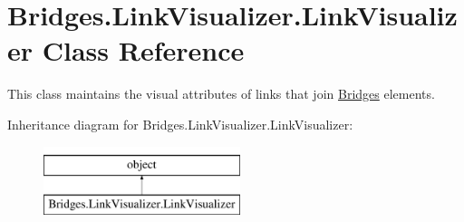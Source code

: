 \hypertarget{class_bridges_1_1_link_visualizer_1_1_link_visualizer}{}\section{Bridges.\+Link\+Visualizer.\+Link\+Visualizer Class Reference}
\label{class_bridges_1_1_link_visualizer_1_1_link_visualizer}


This class maintains the visual attributes of links that join \hyperlink{namespace_bridges_1_1_bridges}{Bridges} elements.  


Inheritance diagram for Bridges.\+Link\+Visualizer.\+Link\+Visualizer\+:\begin{figure}[H]
\begin{center}
\leavevmode
\includegraphics[height=2.000000cm]{class_bridges_1_1_link_visualizer_1_1_link_visualizer}
\end{center}
\end{figure}
